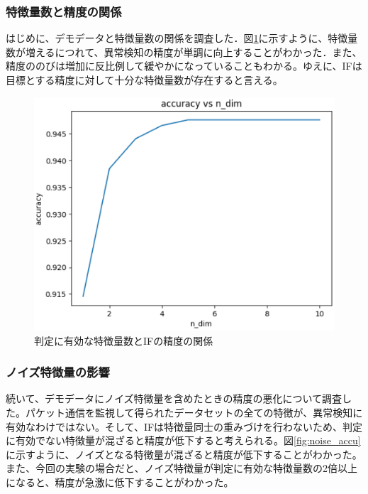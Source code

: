 \documentclass{css}
\begin{document}
\subsubsection{特徴量数と精度の関係}
はじめに、デモデータと特徴量数の関係を調査した．図\ref{fig:dim_vs_accu}に示すように、特徴量数が増えるにつれて、異常検知の精度が単調に向上することがわかった．また、精度ののびは増加に反比例して緩やかになっていることもわかる。ゆえに、IFは目標とする精度に対して十分な特徴量数が存在すると言える。

\begin{figure}[ht]
    \centering
    \includegraphics[width=\linewidth]{pictures/eps/dim_vs_accu.eps}
    \caption{判定に有効な特徴量数とIFの精度の関係}
    \label{fig:dim_vs_accu}
\end{figure}

\subsubsection{ノイズ特徴量の影響}
続いて、デモデータにノイズ特徴量を含めたときの精度の悪化について調査した。パケット通信を監視して得られたデータセットの全ての特徴が、異常検知に有効なわけではない。そして、IFは特徴量同士の重みづけを行わないため、判定に有効でない特徴量が混ざると精度が低下すると考えられる。図\ref{fig:noise_accu}に示すように、ノイズとなる特徴量が混ざると精度が低下することがわかった。また、今回の実験の場合だと、ノイズ特徴量が判定に有効な特徴量数の2倍以上になると、精度が急激に低下することがわかった。
\end{document}
